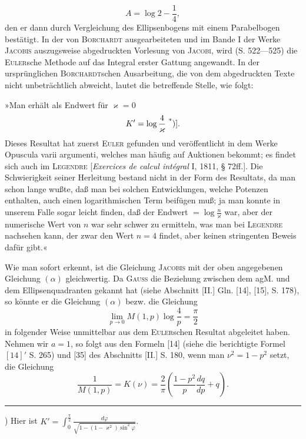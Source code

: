 \[A=\log2-\frac14,\]
\noindent den er dann durch Vergleichung des Ellipsenbogens mit einem Parabelbogen bestätigt. In der von \textsc{Borchardt} ausgearbeiteten und im Bande I der Werke \textsc{Jacobis} auszugsweise abgedruckten Vorlesung von \textsc{Jacobi}, wird (S. 522—525) die \textsc{Euler}sche Methode auf das Integral erster Gattung angewandt. In der ursprünglichen \textsc{Borchardt}schen Ausarbeitung, die von dem abgedruckten Texte nicht unbeträchtlich abweicht, lautet die betreffende Stelle, wie folgt:
\par\indent »Man erhält als Endwert für $\varkappa=0$
\[K'=\log\frac4{\varkappa}\ \text{\textsuperscript{*})]}.\]
\noindent Dieses Resultat hat zuerst \textsc{Euler} gefunden und veröffentlicht in dem Werke Opuscula varii argumenti, welches man häufig auf Auktionen bekommt; es findet sich auch im \textsc{Legendre} [\textit{Exercices de calcul intégral} I, 1811, § 72ff.]. Die Schwierigkeit seiner Herleitung bestand nicht in der Form des Resultats, da man schon lange wußte, daß man bei solchen Entwicklungen, welche Potenzen enthalten, auch einen logarithmischen Term beifügen muß; ja man konnte in unserem Falle sogar leicht finden, daß der Endwert $=\log\frac n{\varkappa}$ war, aber der numerische Wert von $n$ war sehr schwer zu ermitteln, was man bei \textsc{Legendre} nachsehen kann, der zwar den Wert $n=4$ findet, aber keinen stringenten Beweis dafür gibt.«
\par\indent Wie man sofort erkennt, ist die Gleichung \textsc{Jacobis} mit der oben angegebenen Gleichung $(\alpha)$ gleichwertig. Da \textsc{Gauss} die Beziehung zwischen dem agM. und dem Ellipsenquadranten gekannt hat (siehe Abschnitt [II.] Gln. [14], [15], S. 178), so könnte er die Gleichung $(\alpha)$ bezw. die Gleichung
\begin{equation*}\tag*{$(\beta)$}\lim_{p\to0}M(1,p)\log\frac4p=\frac\pi2\end{equation*}
\noindent in folgender Weise unmittelbar aus dem \textsc{Euler}schen Resultat abgeleitet haben. Nehmen wir $a=1$, so folgt aus den Formeln [14] (siehe die berichtigte Formel $[14]'$ S. 265) und [35] des Abschnitts [II.] S. 180, wenn man $\nu^2=1-p^2$ setzt, die Gleichung
\[\frac1{M(1,p)}=K(\nu)=\frac2\pi\left(\frac{1-p^2}{p}\frac{dq}{dp}+q\right).\]
\par\smallskip\noindent\rule{.25\linewidth}{.4pt}\par
{\small\par\indent *) Hier ist $K'=\displaystyle\int_0^{\frac\pi2}\frac{d\varphi}{\sqrt{1-(1-\varkappa^2)\sin^2\varphi}}$.\par}
